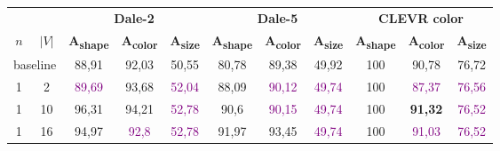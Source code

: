 \begin{table}[ht]
    \centering
    \begin{tabular}{cc|ccc|ccc|ccc}
        \toprule
                                      &         & \multicolumn{3}{c}{\textbf{Dale-2}} & \multicolumn{3}{c}{\textbf{Dale-5}} & \multicolumn{3}{c}{\textbf{CLEVR color}}                                                                                                                                                                                                           \\  \cmidrule(lr){3-5}\cmidrule(lr){6-8}\cmidrule(lr){9-11}
        $n$                           & $|V|$   & \textbf{A\textsubscript{shape}}     & \textbf{A\textsubscript{color}}     & \textbf{A\textsubscript{size}}           & \textbf{A\textsubscript{shape}} & \textbf{A\textsubscript{color}} & \textbf{A\textsubscript{size}} & \textbf{A\textsubscript{shape}} & \textbf{A\textsubscript{color}} & \textbf{A\textsubscript{size}} \\\midrule
        \multicolumn{2}{c|}{baseline} & {88,91} & {92,03}                             & {50,55}                             & {80,78}                                  & {89,38}                         & {49,92}                         & {100}                          & {90,78}                         & {76,72}                                                          \\\midrule
        {1}                           & {2}     & \textcolor{purple}{89,69}           & {93,68}                             & \textcolor{purple}{52,04}                & {88,09}                         & \textcolor{purple}{90,12}       & \textcolor{purple}{49,74}      & {100}                           & \textcolor{purple}{87,37}       & \textcolor{purple}{76,56}      \\
        {1}                           & {10}    & {96,31}                             & {94,21}                             & \textcolor{purple}{52,78}                & {90,6}                          & \textcolor{purple}{90,15}       & \textcolor{purple}{49,74}      & {100}                           & \textbf{91,32}                  & \textcolor{purple}{76,52}      \\
        {1}                           & {16}    & {94,97}                             & \textcolor{purple}{92,8}            & \textcolor{purple}{52,78}                & {91,97}                         & {93,45}                         & \textcolor{purple}{49,74}      & {100}                           & \textcolor{purple}{91,03}       & \textcolor{purple}{76,52}      \\

\end{tabular}
\end{table}
